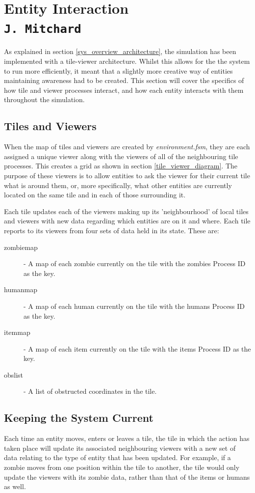 \pagestyle{empty}
\section{Entity Interaction\\{\small\tt J.~Mitchard}}
\label{entity_interactions}
As explained in section \ref{sys_overview_architecture}, the simulation has been implemented with a tile-viewer architecture. Whilst this allows for the the system to run more efficiently, it meant that a slightly more creative way of entities maintaining awareness had to be created. This section will cover the specifics of how tile and viewer processes interact, and how each entity interacts with them throughout the simulation.

\subsection{Tiles and Viewers}
\label{tiles_and_viewers}
When the map of tiles and viewers are created by \emph{environment.fsm}, they are each assigned a unique viewer along with the viewers of all of the neighbouring tile processes. This creates a grid as shown in section \ref{tile_viewer_diagram}. The purpose of these viewers is to allow entities to ask the viewer for their current tile what is around them, or, more specifically, what other entities are currently located on the same tile and in each of those surrounding it.

Each tile updates each of the viewers making up its 'neighbourhood' of local tiles and viewers with new data regarding which entities are on it and where. Each tile reports to its viewers from four sets of data held in its state. These are:
\begin{description}
  \item[zombie\textunderscore map] - A map of each zombie currently on the tile with the zombies Process ID as the key.
  \item[human\textunderscore map] - A map of each human currently on the tile with the humans Process ID as the key.
  \item[item\textunderscore map] - A map of each item currently on the tile with the items Process ID as the key.
  \item[obs\textunderscore list] - A list of obstructed coordinates in the tile.
\end{description}

\subsection{Keeping the System Current}
Each time an entity moves, enters or leaves a tile, the tile in which the action has taken place will update its associated neighbouring viewers with a new set of data relating to the type of entity that has been updated. For example, if a zombie moves from one position within the tile to another, the tile would only update the viewers with its zombie data, rather than that of the items or humans as well.

